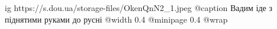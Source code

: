  
 
 
 
 

\ifcmt
  ig https://s.dou.ua/storage-files/OkenQnN2_1.jpeg
  @caption Вадим іде з піднятими руками до русні
  @width 0.4
  @minipage 0.4
  @wrap \parpic[r]
\fi
